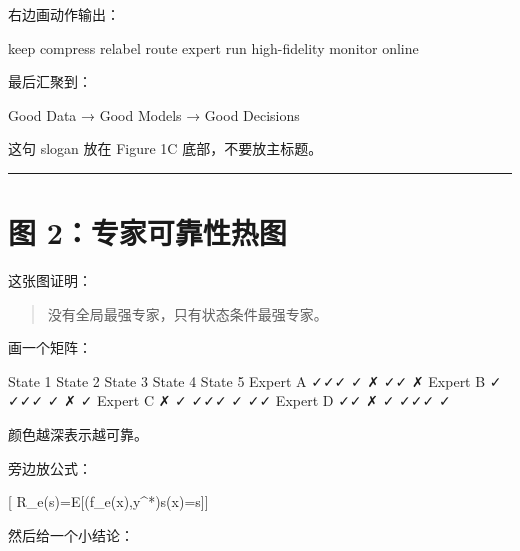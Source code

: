 \documentclass[
  12pt,
]{ctexart}
\newenvironment{Shaded}{}{}
\newcommand{\NormalTok}[1]{#1}
\begin{document}
右边画动作输出：

\begin{Shaded}
\begin{Highlighting}[]
\NormalTok{keep}
\NormalTok{compress}
\NormalTok{relabel}
\NormalTok{route expert}
\NormalTok{run high{-}fidelity}
\NormalTok{monitor online}
\end{Highlighting}
\end{Shaded}

最后汇聚到：

\begin{Shaded}
\begin{Highlighting}[]
\NormalTok{Good Data → Good Models → Good Decisions}
\end{Highlighting}
\end{Shaded}

这句 slogan 放在 Figure 1C 底部，不要放主标题。

\begin{center}\rule{0.5\linewidth}{0.5pt}\end{center}

\section{图
2：专家可靠性热图}\label{ux56fe-2ux4e13ux5bb6ux53efux9760ux6027ux70edux56fe}

这张图证明：

\begin{quote}
没有全局最强专家，只有状态条件最强专家。
\end{quote}

画一个矩阵：

\begin{Shaded}
\begin{Highlighting}[]
\NormalTok{              State 1   State 2   State 3   State 4   State 5}
\NormalTok{Expert A        ✓✓✓       ✓         ✗         ✓✓        ✗}
\NormalTok{Expert B        ✓         ✓✓✓       ✓         ✗         ✓}
\NormalTok{Expert C        ✗         ✓         ✓✓✓       ✓         ✓✓}
\NormalTok{Expert D        ✓✓        ✗         ✓         ✓✓✓       ✓}
\end{Highlighting}
\end{Shaded}

颜色越深表示越可靠。

旁边放公式：

{[} R\_e(s)=\mathbb E{[}\ell(f\_e(x),y\^{}*)\mid s(x)=s{]}{]}

然后给一个小结论：
\end{document}
